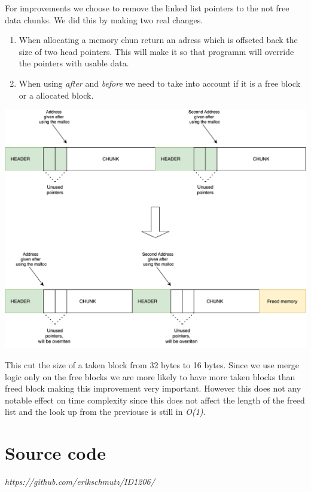 \documentclass{article}
\begin{document}
For improvements we choose to remove the linked list pointers to the not free data chunks. We did this by making two real changes.

\begin{enumerate}
    \item When allocating a memory chun return an adress which is offseted back the size of two head pointers. This will make it so that programm will override the pointers with usable data.
    \item When using \emph{after} and \emph{before} we need to take into account if it is a free block or a allocated block. 
\end{enumerate}



\begin{center}
    \includegraphics[scale=0.12]{images/no-pointer-on-taken.png}
\end{center}
     
     
This cut the size of a taken block from 32 bytes to 16 bytes. Since we use merge logic only on the free blocks we are more likely to have more taken blocks than freed block making this improvement very important. However this does not any notable effect on time complexity since this does not affect the length of the freed list and the look up from the previouse is still in \emph{O(1)}.



\section{Source code}


\emph{https://github.com/erikschmutz/ID1206/}
\end{document}
